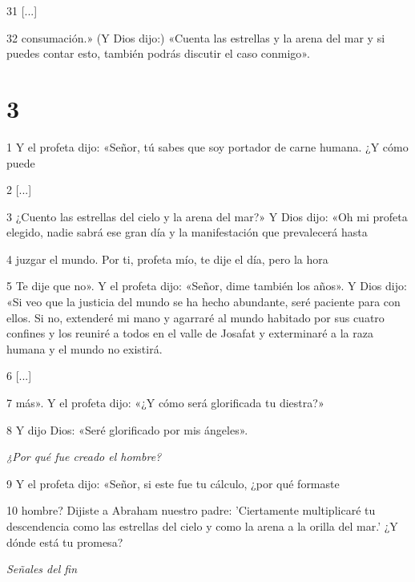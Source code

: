 \par 31 [...]

\par 32 consumación.» (Y Dios dijo:) «Cuenta las estrellas y la arena del mar y si puedes contar esto, también podrás discutir el caso conmigo».

\chapter{3}

\par 1 Y el profeta dijo: «Señor, tú sabes que soy portador de carne humana. ¿Y cómo puede

\par 2 [...]

\par 3 ¿Cuento las estrellas del cielo y la arena del mar?» Y Dios dijo: «Oh mi profeta elegido, nadie sabrá ese gran día y la manifestación que prevalecerá hasta

\par 4 juzgar el mundo. Por ti, profeta mío, te dije el día, pero la hora

\par 5 Te dije que no». Y el profeta dijo: «Señor, dime también los años». Y Dios dijo: «Si veo que la justicia del mundo se ha hecho abundante, seré paciente para con ellos. Si no, extenderé mi mano y agarraré al mundo habitado por sus cuatro confines y los reuniré a todos en el valle de Josafat y exterminaré a la raza humana y el mundo no existirá.

\par 6 [...]

\par 7 más». Y el profeta dijo: «¿Y cómo será glorificada tu diestra?»

\par 8 Y dijo Dios: «Seré glorificado por mis ángeles».

\par \textit{¿Por qué fue creado el hombre?}

\par 9 Y el profeta dijo: «Señor, si este fue tu cálculo, ¿por qué formaste

\par 10 hombre? Dijiste a Abraham nuestro padre: 'Ciertamente multiplicaré tu descendencia como las estrellas del cielo y como la arena a la orilla del mar.' ¿Y dónde está tu promesa?

\par \textit{Señales del fin}

